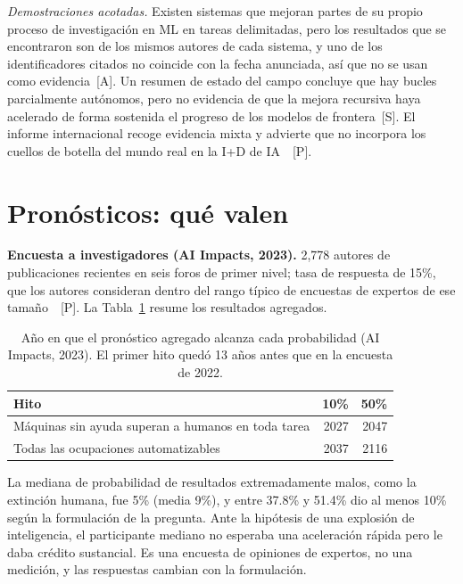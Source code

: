 \documentclass[10pt]{article}
\newcommand{\tP}{\textsf{\small[P]}}
\newcommand{\tS}{\textsf{\small[S]}}
\newcommand{\tA}{\textsf{\small[A]}}
\begin{document}
\emph{Demostraciones acotadas.} Existen sistemas que mejoran partes de su propio proceso de investigaci\'on en ML en tareas delimitadas, pero los resultados que se encontraron son de los mismos autores de cada sistema, y uno de los identificadores citados no coincide con la fecha anunciada, as\'i que no se usan como evidencia~\tA. Un resumen de estado del campo concluye que hay bucles parcialmente aut\'onomos, pero no evidencia de que la mejora recursiva haya acelerado de forma sostenida el progreso de los modelos de frontera~\tS. El informe internacional recoge evidencia mixta y advierte que no incorpora los cuellos de botella del mundo real en la I+D de IA~\cite{iasr2026}~\tP.

\section{Pron\'osticos: qu\'e valen}

\textbf{Encuesta a investigadores (AI Impacts, 2023).} 2,778 autores de publicaciones recientes en seis foros de primer nivel; tasa de respuesta de 15\%, que los autores consideran dentro del rango t\'ipico de encuestas de expertos de ese tama\~no~\cite{grace2023}~\tP. La Tabla~\ref{tab:encuesta} resume los resultados agregados.

\begin{table}[H]
\centering\small
\begin{tabular}{@{}p{4.4cm}rr@{}}
\toprule
Hito & 10\% & 50\% \\
\midrule
M\'aquinas sin ayuda superan a humanos en toda tarea & 2027 & 2047 \\
Todas las ocupaciones automatizables & 2037 & 2116 \\
\bottomrule
\end{tabular}
\caption{A\~no en que el pron\'ostico agregado alcanza cada probabilidad (AI Impacts, 2023). El primer hito qued\'o 13 a\~nos antes que en la encuesta de 2022.}
\label{tab:encuesta}
\end{table}

La mediana de probabilidad de resultados extremadamente malos, como la extinci\'on humana, fue 5\% (media 9\%), y entre 37.8\% y 51.4\% dio al menos 10\% seg\'un la formulaci\'on de la pregunta. Ante la hip\'otesis de una explosi\'on de inteligencia, el participante mediano no esperaba una aceleraci\'on r\'apida pero le daba cr\'edito sustancial. Es una encuesta de opiniones de expertos, no una medici\'on, y las respuestas cambian con la formulaci\'on.
\end{document}
